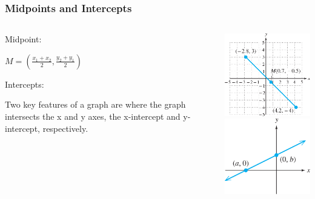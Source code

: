 \documentclass{beamer}
\begin{document}
\begin{frame}\frametitle{Midpoints and Intercepts}
\begin{columns}
\begin{column}{6cm}

Midpoint: \newline

\hspace*{10mm}$M = (\frac{x_1+x_2}{2},\frac{y_2+y_1}{2})$ \newline


Intercepts: \newline

Two key features of a graph are where the graph intersects the x and y axes, the x-intercept and y-intercept, respectively.


\end{column}
\begin{column}{5cm}
\begin{center}
\includegraphics[width=4cm]{fig/midpoint.png}
\includegraphics[width=4cm]{fig/intercept.png}
\end{center}
\end{column}
\end{columns}
\end{frame}
\end{document}
